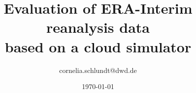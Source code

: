 \documentclass[a4paper,11pt]{article}
\begin{document}
\title{Evaluation of ERA-Interim reanalysis data\\ based on a cloud simulator}
\author{cornelia.schlundt@dwd.de}
\date{\today}
\maketitle

\tableofcontents

\newpage
\listoffigures


\newpage



\newpage


\newpage



\newpage

% 

\end{document}
